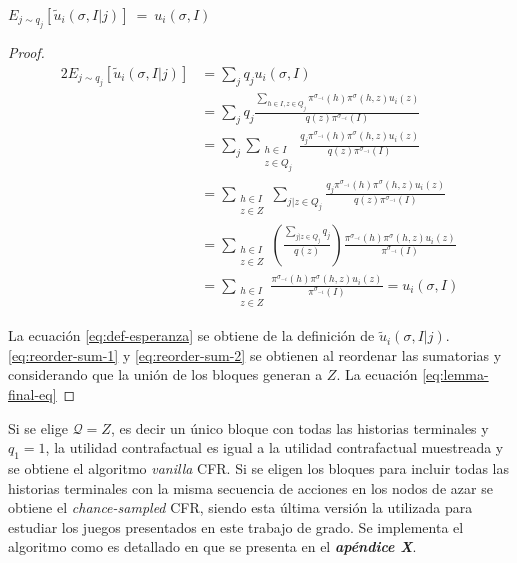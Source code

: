 \begin{lemma}
$E_{j \sim q_j} [\tilde{u}_i(\sigma, I | j)]\ =\ u_i(\sigma, I)$
\end{lemma}
\begin{proof}
\begin{alignat}{2}
    E_{j \sim q_j}[\tilde{u}_i(\sigma, I | j)] & = \sum_{j} {q_j u_i(\sigma, I)} \\
    & = \sum_{j} { q_j \frac{\sum_{h \in I, z \in Q_j} \pi^{\sigma_{-i}}(h) \pi^{\sigma}(h, z) u_i(z)}{q(z) \pi^{\sigma_{-i}}(I)}} \\ \label{eq:def-esperanza}
    & = \sum_{j} \sum_{ \substack{h \in I \\ z \in Q_j}} \frac{q_j \pi^{\sigma_{-i}}(h) \pi^{\sigma}(h, z) u_i(z)}{ q(z) \pi^{\sigma_{-i}}(I)} \\ \label{eq:reorder-sum-1}
    & = \sum_{ \substack{h \in I \\ z \in Z} } \sum_{j | z \in Q_j} \frac{q_j \pi^{\sigma_{-i}}(h) \pi^{\sigma}(h, z) u_i(z)}{ q(z) \pi^{\sigma_{-i}}(I)} \\ \label{eq:reorder-sum-2}
    & = \sum_{ \substack{h \in I \\ z \in Z} } \left(\frac{\sum_{j | z \in Q_j} q_j }{q(z)}\right) \frac{\pi^{\sigma_{-i}}(h) \pi^{\sigma}(h, z) u_i(z)}{\pi^{\sigma_{-i}}(I)} \\
    & = \sum_{ \substack{h \in I \\ z \in Z} } \frac{\pi^{\sigma_{-i}}(h) \pi^{\sigma}(h, z) u_i(z)}{\pi^{\sigma_{-i}}(I)}  = u_i(\sigma, I) \label{eq:lemma-final-eq}
\end{alignat}

La ecuación \ref{eq:def-esperanza} se obtiene de la definición de $\tilde{u}_i(\sigma, I | j)$. \ref{eq:reorder-sum-1} y \ref{eq:reorder-sum-2} se obtienen al reordenar las sumatorias y considerando que la unión de los bloques generan a $Z$. La ecuación \ref{eq:lemma-final-eq}
\end{proof}

Si se elige $\mathcal{Q} = {Z}$, es decir un único bloque con todas las historias terminales y $q_1 = 1$, la utilidad contrafactual es igual a la utilidad contrafactual muestreada y se obtiene el algoritmo \textit{vanilla} CFR. Si se eligen los bloques para incluir todas las historias terminales con la misma secuencia de acciones en los nodos de azar se obtiene el \textit{chance-sampled} CFR, siendo esta última versión la utilizada para estudiar los juegos presentados en este trabajo de grado. Se implementa el algoritmo como es detallado en \cite{bib:introductionCFR} que se presenta en el \textit{\textbf{apéndice X}}.


